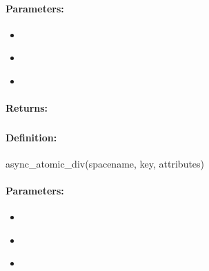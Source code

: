 \paragraph{Parameters:}
\begin{itemize}[noitemsep]
\item {}\\

\item {}\\

\item {}\\

\end{itemize}

\paragraph{Returns:}


\pagebreak
\subsubsection{}
\label{api:ruby:async_atomic_div}


\paragraph{Definition:}
\begin{rubycode}
async_atomic_div(spacename, key, attributes)
\end{rubycode}

\paragraph{Parameters:}
\begin{itemize}[noitemsep]
\item {}\\

\item {}\\

\item {}\\

\end{itemize}


